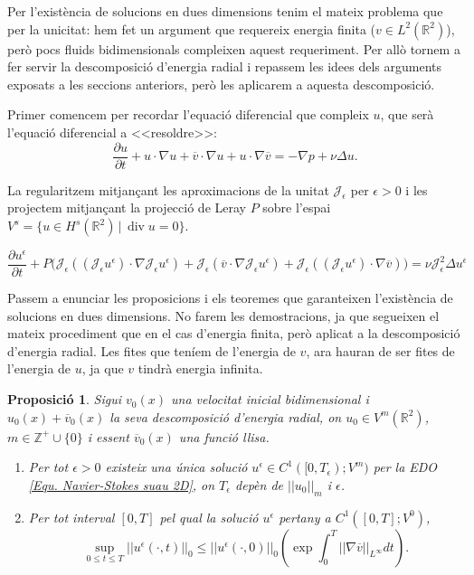 \documentclass{article}
\numberwithin{equation}{section}
\DeclareMathOperator{\diver}{div}
\newtheorem{proposicio}{Proposici\'{o}}[section]
\begin{document}
Per l'exist\`{e}ncia de solucions en dues dimensions tenim el mateix problema que per la unicitat: hem fet un argument que requereix energia finita ($v\in L^2(\mathbb{R}^2)$), per\`{o} pocs fluids bidimensionals compleixen aquest requeriment. Per all\`{o} tornem a fer servir la descomposici\'{o} d'energia radial i repassem les idees dels arguments exposats a les seccions anteriors, per\`{o} les aplicarem a aquesta descomposici\'{o}.

Primer comencem per recordar l'equaci\'{o} diferencial que compleix $u$, que ser\`{a} l'equaci\'{o} diferencial a <<resoldre>>:
\[\frac{\partial u}{\partial t}+u\cdot\nabla u+\overline v\cdot\nabla u+u\cdot\nabla\overline v=-\nabla p+\nu\Delta u.\]

La regularitzem mitjan\c{c}ant les aproximacions de la unitat $\mathcal{J}_{\epsilon}$ per $\epsilon>0$ i les projectem mitjan\c{c}ant la projecci\'{o} de Leray $P$ sobre l'espai $V^s=\{u\in H^s(\mathbb{R}^2)\,|\,\diver u=0\}$.

\begin{equation}\label{Equ. Navier-Stokes suau 2D}
\frac{\partial u^{\epsilon}}{\partial t}+P\Big(\mathcal{J}_{\epsilon}((\mathcal{J}_{\epsilon}u^{\epsilon})\cdot\nabla\mathcal{J}_{\epsilon}u^{\epsilon})+\mathcal{J}_{\epsilon}(\overline v\cdot\nabla\mathcal{J}_{\epsilon}u^{\epsilon})+\mathcal{J}_{\epsilon}((\mathcal{J}_{\epsilon}u^{\epsilon})\cdot\nabla\overline v)\Big)=\nu\mathcal{J}_{\epsilon}^2\Delta u^{\epsilon}
\end{equation}

Passem a enunciar les proposicions i els teoremes que garanteixen l'exist\`{e}ncia de solucions en dues dimensions. No farem les demostracions, ja que segueixen el mateix procediment que en el cas d'energia finita, per\`{o} aplicat a la descomposici\'{o} d'energia radial. Les fites que ten\'{i}em de l'energia de $v$, ara hauran de ser fites de l'energia de $u$, ja que $v$ tindr\`{a} energia infinita.

\begin{proposicio}
Sigui $v_0(x)$ una velocitat inicial bidimensional i $u_0(x)+\overline v_0(x)$ la seva descomposici\'{o} d'energia radial, on $u_0\in V^m(\mathbb{R}^2)$, $m\in\mathbb{Z}^+\cup\{0\}$ i essent $\overline v_0(x)$ una funci\'{o} llisa.
\begin{enumerate}
\item Per tot $\epsilon>0$ existeix una \'{u}nica soluci\'{o} $u^{\epsilon}\in C^1([0,T_{\epsilon});V^m)$ per la EDO \eqref{Equ. Navier-Stokes suau 2D}, on $T_{\epsilon}$ dep\`{e}n de $||u_0||_m$ i $\epsilon$.
\item Per tot interval $[0,T]$ pel qual la soluci\'{o} $u^{\epsilon}$ pertany a $C^1([0,T];V^0)$,
\begin{equation}\label{Equ. fita energia 2D}
\sup_{0\leq t\leq T}||u^{\epsilon}(\cdot,t)||_0\leq||u^{\epsilon}(\cdot,0)||_0\left(\exp\int_0^T||\nabla\overline v||_{L^{\infty}}dt\right).
\end{equation}
\end{enumerate}
\end{proposicio}
\end{document}
